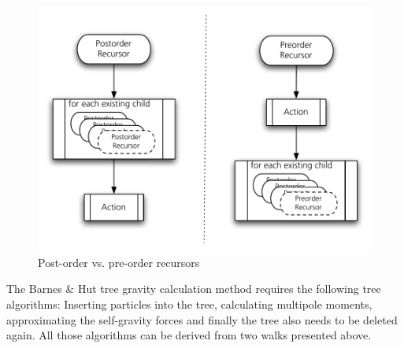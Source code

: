 \begin{figure}[htbp]
\begin{center}
\includegraphics[scale=0.6]{12orderwalks.pdf}
\caption{Post-order vs. pre-order recursors}
\label{ch02_fig12}
\end{center}
\end{figure}

The Barnes \& Hut tree gravity calculation method requires the following tree algorithms: Inserting particles into the tree, calculating multipole moments, approximating the self-gravity forces and finally the tree also needs to be deleted again. All those algorithms can be derived from two walks presented above.

